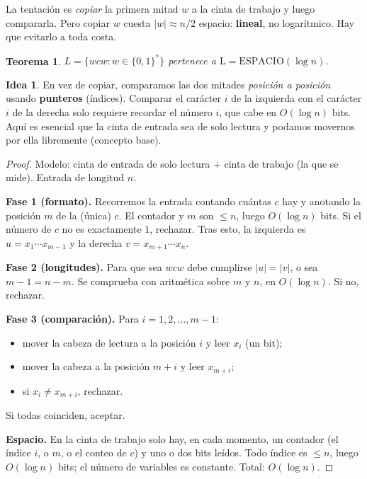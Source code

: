 \documentclass[11pt,a4paper]{article}
\theoremstyle{plain}
\newtheorem{teorema}{Teorema}
\theoremstyle{definition}
\newtheorem*{idea}{Idea}
\newcommand{\Lclass}{\mathrm{L}}
\newcommand{\SPACE}{\mathrm{ESPACIO}}
\begin{document}
\begin{cuidado}
La tentaci\'on es \emph{copiar} la primera mitad $w$ a la cinta de trabajo y luego
compararla. Pero copiar $w$ cuesta $|w|\approx n/2$ espacio: \textbf{lineal}, no
logar\'itmico. Hay que evitarlo a toda costa.
\end{cuidado}

\begin{teorema}
$L=\{wcw : w\in\{0,1\}^{*}\}$ pertenece a $\Lclass=\SPACE(\log n)$.
\end{teorema}

\begin{idea}
En vez de copiar, comparamos las dos mitades \emph{posici\'on a posici\'on} usando
\textbf{punteros} (\'indices). Comparar el car\'acter $i$ de la izquierda con el
car\'acter $i$ de la derecha solo requiere recordar el n\'umero $i$, que cabe en
$O(\log n)$ bits. Aqu\'i es esencial que la cinta de entrada sea de solo lectura y
podamos movernos por ella libremente (concepto base).
\end{idea}

\begin{proof}
Modelo: cinta de entrada de solo lectura + cinta de trabajo (la que se mide). Entrada
de longitud $n$.

\textbf{Fase 1 (formato).} Recorremos la entrada contando cu\'antas $c$ hay y
anotando la posici\'on $m$ de la (\'unica) $c$. El contador y $m$ son $\le n$, luego
$O(\log n)$ bits. Si el n\'umero de $c$ no es exactamente $1$, rechazar. Tras esto,
la izquierda es $u=x_1\cdots x_{m-1}$ y la derecha $v=x_{m+1}\cdots x_n$.

\textbf{Fase 2 (longitudes).} Para que sea $wcw$ debe cumplirse $|u|=|v|$, o sea
$m-1=n-m$. Se comprueba con aritm\'etica sobre $m$ y $n$, en $O(\log n)$. Si no,
rechazar.

\textbf{Fase 3 (comparaci\'on).} Para $i=1,2,\dots,m-1$:
\begin{itemize}[nosep]
  \item mover la cabeza de lectura a la posici\'on $i$ y leer $x_i$ (un bit);
  \item mover la cabeza a la posici\'on $m+i$ y leer $x_{m+i}$;
  \item si $x_i\neq x_{m+i}$, rechazar.
\end{itemize}
Si todas coinciden, aceptar.

\textbf{Espacio.} En la cinta de trabajo solo hay, en cada momento, un contador
(el \'indice $i$, o $m$, o el conteo de $c$) y uno o dos bits le\'idos. Todo \'indice
es $\le n$, luego $O(\log n)$ bits; el n\'umero de variables es constante. Total:
$O(\log n)$.
\end{proof}
\end{document}
